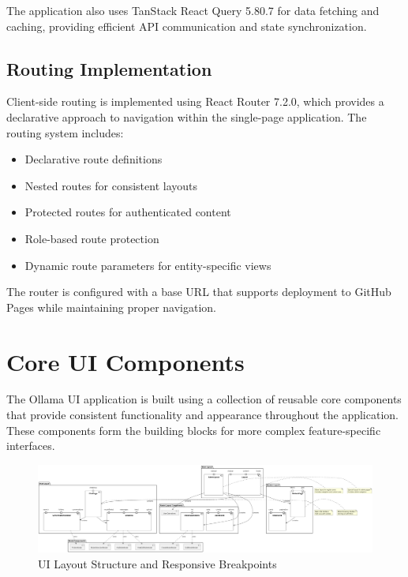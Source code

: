 The application also uses TanStack React Query 5.80.7 for data fetching and caching, providing efficient API communication and state synchronization.

\subsection{Routing Implementation}

Client-side routing is implemented using React Router 7.2.0, which provides a declarative approach to navigation within the single-page application. The routing system includes:

\begin{itemize}
  \item Declarative route definitions
  \item Nested routes for consistent layouts
  \item Protected routes for authenticated content
  \item Role-based route protection
  \item Dynamic route parameters for entity-specific views
\end{itemize}

The router is configured with a base URL that supports deployment to GitHub Pages while maintaining proper navigation.

\section{Core UI Components}

The Ollama UI application is built using a collection of reusable core components that provide consistent functionality and appearance throughout the application. These components form the building blocks for more complex feature-specific interfaces.

\begin{figure}[p]
    \centering
    \includegraphics[width=\textwidth]{./Chapter07/figures/ui_layout_structure.png}
    \caption{UI Layout Structure and Responsive Breakpoints}
    \label{fig:ui-layout-structure}
\end{figure}
\clearpage

